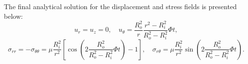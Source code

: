 The final analytical solution for the displacement and stress fields is presented below:
\begin{equation}
  u_r = u_z = 0, \quad u_\theta = \frac{R_o^2}{r} \frac{r^2 - R_i^2}{R_o^{2} - R_i^{2}} \Phi t,
\end{equation}
\begin{equation}
  \sigma_{rr} = - \sigma_{\theta \theta} = \mu \frac{R_i^{2}}{r^{2}} \left[ \cos \left( 2 \frac{R_o^{2}}{R_o^{2} - R_i^{2}} \Phi t \right) - 1 \right], \quad \sigma_{r \theta} = \mu \frac{R_i^{2}}{r^{2}} \sin \left( 2 \frac{R_o^{2}}{R_o^{2} - R_i^{2}} \Phi t \right).
\end{equation}